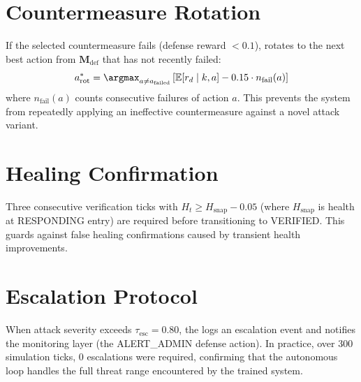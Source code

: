 \section{Countermeasure Rotation}

If the selected countermeasure fails (defense reward $< 0.1$), \arl{}
rotates to the next best action from $\mathbf{M}_{\mathrm{def}}$ that
has not recently failed:
\begin{equation}
  a^*_{\mathrm{rot}} = \argmax_{a \neq a_{\mathrm{failed}}}
    \left[\E[r_d \mid k, a] - 0.15 \cdot n_{\mathrm{fail}}(a)\right]
\end{equation}
where $n_{\mathrm{fail}}(a)$ counts consecutive failures of action $a$.
This prevents the system from repeatedly applying an ineffective
countermeasure against a novel attack variant.

\section{Healing Confirmation}

Three consecutive verification ticks with $H_t \geq H_{\mathrm{snap}} - 0.05$
(where $H_{\mathrm{snap}}$ is health at RESPONDING entry) are required
before transitioning to VERIFIED. This guards against false healing
confirmations caused by transient health improvements.

\section{Escalation Protocol}

When attack severity exceeds $\tau_{\mathrm{esc}} = 0.80$, the \arl{}
logs an escalation event and notifies the monitoring layer (the
ALERT\_ADMIN defense action). In practice, over 300 simulation ticks,
0 escalations were required, confirming that the autonomous loop handles
the full threat range encountered by the trained \caesar{} system.
